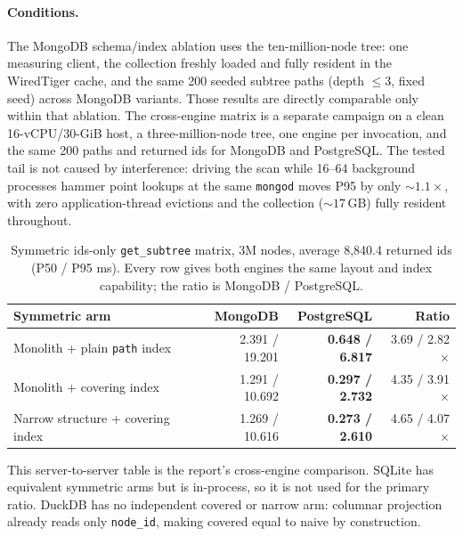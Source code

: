 \documentclass[11pt]{article}
\newcommand{\code}[1]{\texttt{#1}}
\newcommand{\best}[1]{\textbf{#1}}
\newcommand{\hdr}{\rowcolor{hdrgray}}
\newcommand{\key}{\rowcolor{keyrow}}
\newenvironment{ctab}{\par\medskip\centering\small
  \setlength{\tabcolsep}{5pt}\renewcommand{\arraystretch}{1.12}}{\par\medskip}
\begin{document}
\paragraph{Conditions.} The MongoDB schema/index ablation uses the
ten-million-node tree: one measuring client, the collection freshly loaded and
fully resident in the WiredTiger cache, and the same 200 seeded subtree paths
(depth ${\le}3$, fixed seed) across MongoDB variants. Those results are directly
comparable only within that ablation. The cross-engine matrix is a separate
campaign on a clean 16-vCPU/30-GiB host, a three-million-node tree, one engine
per invocation, and the same 200 paths and returned ids for MongoDB and
PostgreSQL. The tested tail is not caused by interference: driving
the scan while 16--64 background processes hammer point lookups at the same
\code{mongod} moves P95 by only ${\sim}1.1{\times}$, with zero application-thread
evictions and the collection (${\sim}17$\,GB) fully resident throughout.

\begin{table}[h]
\caption{Symmetric ids-only \code{get\_subtree} matrix, 3M nodes, average
8{,}840.4 returned ids (P50 / P95 ms). Every row gives both engines the same
layout and index capability; the ratio is MongoDB / PostgreSQL.}
\label{tab:fair}
\begin{ctab}
\begin{tabular}{@{}lrrr@{}}
\toprule
\hdr Symmetric arm & MongoDB & PostgreSQL & Ratio \\
\midrule
Monolith + plain \code{path} index & 2.391 / 19.201 & \best{0.648 / 6.817} & 3.69 / 2.82$\times$ \\
\key Monolith + covering index & 1.291 / 10.692 & \best{0.297 / 2.732} & 4.35 / 3.91$\times$ \\
Narrow structure + covering index & 1.269 / 10.616 & \best{0.273 / 2.610} & 4.65 / 4.07$\times$ \\
\bottomrule
\end{tabular}
\end{ctab}
\end{table}

This server-to-server table is the report's cross-engine comparison. SQLite has
equivalent symmetric arms but is in-process, so it is not used for the primary
ratio. DuckDB has no independent covered or narrow arm: columnar projection
already reads only \code{node\_id}, making covered equal to naive by
construction.
\end{document}
